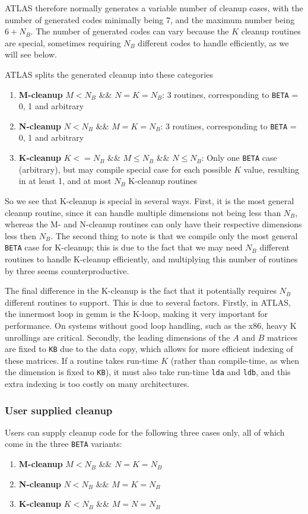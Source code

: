 \documentclass[11pt]{article}
\begin{document}
ATLAS therefore normally generates a variable number of cleanup cases,
with the number of generated codes minimally being $7$, and the maximum
number being $6 + N_B$.  The number of generated codes can vary because
the $K$ cleanup routines are special, sometimes requiring $N_B$ different
codes to handle efficiently, as we will see below.

ATLAS splits the generated cleanup into these categories
\begin{enumerate}
\item {\bf M-cleanup} $M < N_B$ \&\& $N = K = N_B$:
   3 routines, corresponding to {\tt BETA} = 0, 1 and arbitrary
\item {\bf N-cleanup} $N < N_B$ \&\& $M = K = N_B$:
   3 routines, corresponding to {\tt BETA} = 0, 1 and arbitrary
\item {\bf K-cleanup} $K <= N_B$ \&\& $M \leq N_B$ \&\& $N \leq N_B$:
   Only one {\tt BETA} case (arbitrary), but may compile special case for
   each possible $K$ value, resulting in at least 1, and at most $N_B$
   K-cleanup routines
\end{enumerate}

So we see that K-cleanup is special in several ways.  First, it is the
most general cleanup routine, since it can handle multiple dimensions not
being less than $N_B$, whereas the M- and N-cleanup routines can only have
their respective dimensions less then $N_B$.  The second thing to note is
that we compile only the most general {\tt BETA} case for K-cleanup; this
is due to the fact that we may need $N_B$ different routines to handle
K-cleanup efficiently, and multiplying this number of routines by three seems
counterproductive.

The final difference in the K-cleanup is the fact that it potentially requires
$N_B$ different routines to support.  This is due to several factors.
Firstly, in ATLAS, the innermost loop in gemm is the K-loop, making it
very important for performance.  On systems without good loop handling,
such as the x86, heavy K unrollings are critical.
Secondly, the leading dimensions of the $A$ and $B$ matrices are fixed
to {\tt KB} due to the data copy, which allows for more efficient indexing
of these matrices.  If a routine takes run-time $K$ (rather than compile-time,
as when the dimension is fixed to {\tt KB}), it must also take run-time 
{\tt lda} and {\tt ldb}, and this extra indexing is too costly on
many architectures.

\subsubsection{User supplied cleanup}
Users can supply cleanup code for the following three cases only, all of
which come in the three {\tt BETA} variants:
\begin{enumerate}
\item {\bf M-cleanup} $M < N_B$ \&\& $N = K = N_B$
\item {\bf N-cleanup} $N < N_B$ \&\& $M = K = N_B$
\item {\bf K-cleanup} $K < N_B$ \&\& $M = N = N_B$
\end{enumerate}
\end{document}
